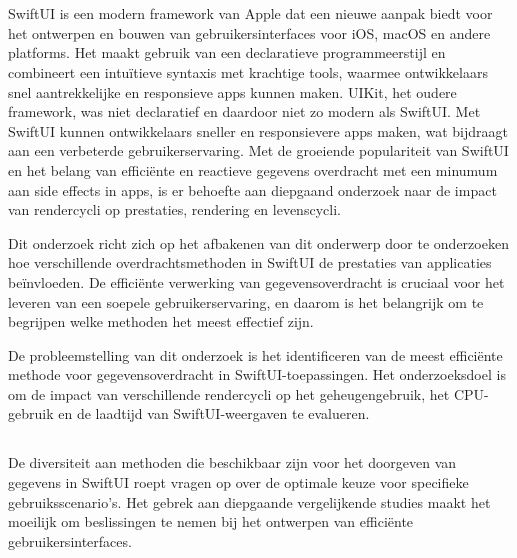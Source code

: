 
\chapter{}%
\label{ch:inleiding}

SwiftUI is een modern framework van Apple dat een nieuwe aanpak biedt voor het ontwerpen en bouwen van gebruikersinterfaces voor iOS, macOS en andere platforms. Het maakt gebruik van een declaratieve programmeerstijl en combineert een intuïtieve syntaxis met krachtige tools, waarmee ontwikkelaars snel aantrekkelijke en responsieve apps kunnen maken. UIKit, het oudere framework, was niet declaratief en daardoor niet zo modern als SwiftUI. Met SwiftUI kunnen ontwikkelaars sneller en responsievere apps maken, wat bijdraagt aan een verbeterde gebruikerservaring. Met de groeiende populariteit van SwiftUI en het belang van efficiënte en reactieve gegevens overdracht met een minumum aan side effects in apps, is er behoefte aan diepgaand onderzoek naar de impact van rendercycli op prestaties, rendering en levenscycli.

Dit onderzoek richt zich op het afbakenen van dit onderwerp door te onderzoeken hoe verschillende overdrachtsmethoden in SwiftUI de prestaties van applicaties beïnvloeden. De efficiënte verwerking van gegevensoverdracht is cruciaal voor het leveren van een soepele gebruikerservaring, en daarom is het belangrijk om te begrijpen welke methoden het meest effectief zijn.

De probleemstelling van dit onderzoek is het identificeren van de meest efficiënte methode voor gegevensoverdracht in SwiftUI-toepassingen. Het onderzoeksdoel is om de impact van verschillende rendercycli op het geheugengebruik, het CPU-gebruik en de laadtijd van SwiftUI-weergaven te evalueren.

\section{}%
\label{sec:probleemstelling}

%
De diversiteit aan methoden die beschikbaar zijn
voor het doorgeven van gegevens in SwiftUI roept vragen op
over de optimale keuze voor specifieke gebruiksscenario's.
Het gebrek aan diepgaande vergelijkende
studies maakt het
moeilijk om beslissingen te nemen bij het ontwerpen
van efficiënte gebruikersinterfaces.


